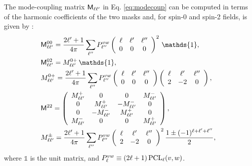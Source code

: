 \documentclass[usenatbib]{mnrasb}
\newcommand{\wtj}[6]{\left(\begin{array}{ccc} #1 & #2 & #3\\#4 & #5 & #6\end{array} \right)}
\newcommand{\mI}{{\mathds{1}}}
\begin{document}
        The mode-coupling matrix ${\sf M}_{\ell\ell'}$ in Eq. \ref{eq:modecoup} can be computed in terms of the harmonic coefficients of the two masks and, for spin-0 and spin-2 fields, is given by \citep{2002ApJ...567....2H,2003ApJS..148..161K}:
        \begin{align}\label{eq:m00}
          &{\sf M}^{00}_{\ell\ell'}=\frac{2\ell'+1}{4\pi}\sum_{\ell''}P^{vw}_{\ell''}\wtj{\ell}{\ell'}{\ell''}{0}{0}{0}^2\,\mI,\\\label{eq:m02}
          &{\sf M}^{02}_{\ell\ell'}=M^{0+}_{\ell\ell'}\,\mI,\\\nonumber
          &M^{0+}_{\ell\ell'}=\frac{2\ell'+1}{4\pi}\sum_{\ell''}P^{vw}_{\ell''}\wtj{\ell}{\ell'}{\ell''}{0}{0}{0}\wtj{\ell}{\ell'}{\ell''}{2}{-2}{0},\\\label{eq:m22}
          &{\sf M}^{22}=\left(
                        \begin{array}{cccc}
                          M^{+}_{\ell\ell'} & 0 & 0 & M^{-}_{\ell\ell'} \\
                          0 & M^{+}_{\ell\ell'} & -M^{-}_{\ell\ell'} & 0 \\
                          0 & -M^{-}_{\ell\ell'} & M^{+}_{\ell\ell'} & 0 \\
                          M^{-}_{\ell\ell'} & 0 & 0 & M^{+}_{\ell\ell'}
                        \end{array}\right),\\\nonumber
          &M^{\pm}_{\ell\ell'}=\frac{2\ell'+1}{4\pi}\sum_{\ell''}P^{vw}_{\ell''}\wtj{\ell}{\ell'}{\ell''}{2}{-2}{0}^2\frac{1\pm(-1)^{\ell+\ell'+\ell''}}{2},
        \end{align}
        where $\mI$ is the unit matrix, and $P^{vw}_\ell\equiv(2\ell+1)\,{\rm PCL}_\ell(v,w)$.
      
\end{document}
